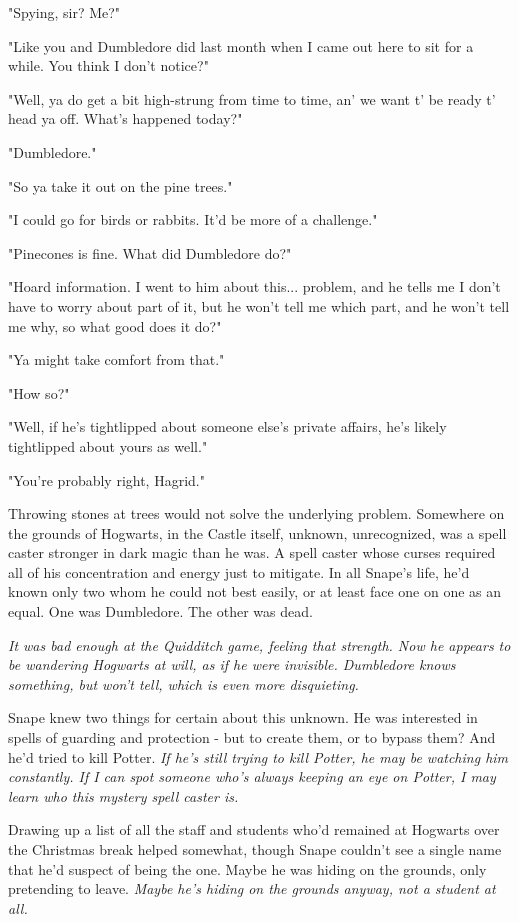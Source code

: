 \documentclass[a4paper,11pt]{article}
\begin{document}
"Spying, sir? Me?"

"Like you and Dumbledore did last month when I came out here to sit for a while. You think I don't notice?"

"Well, ya do get a bit high-strung from time to time, an' we want t' be ready t' head ya off. What's happened today?"

"Dumbledore."

"So ya take it out on the pine trees."

"I could go for birds or rabbits. It'd be more of a challenge."

"Pinecones is fine. What did Dumbledore do?"

"Hoard information. I went to him about this... problem, and he tells me I don't have to worry about part of it, but he won't tell me which part, and he won't tell me why, so what good does it do?"

"Ya might take comfort from that."

"How so?"

"Well, if he's tightlipped about someone else's private affairs, he's likely tightlipped about yours as well."

"You're probably right, Hagrid."

Throwing stones at trees would not solve the underlying problem. Somewhere on the grounds of Hogwarts, in the Castle itself, unknown, unrecognized, was a spell caster stronger in dark magic than he was. A spell caster whose curses required all of his concentration and energy just to mitigate. In all Snape's life, he'd known only two whom he could not best easily, or at least face one on one as an equal. One was Dumbledore. The other was dead.

\emph{It was bad enough at the Quidditch game, feeling that strength. Now he appears to be wandering Hogwarts at will, as if he were invisible. Dumbledore knows something, but won't tell, which is even more disquieting.}

Snape knew two things for certain about this unknown. He was interested in spells of guarding and protection - but to create them, or to bypass them? And he'd tried to kill Potter. \emph{If he's still trying to kill Potter, he may be watching him constantly. If I can spot someone who's always keeping an eye on Potter, I may learn who this mystery spell caster is.}

Drawing up a list of all the staff and students who'd remained at Hogwarts over the Christmas break helped somewhat, though Snape couldn't see a single name that he'd suspect of being the one. Maybe he was hiding on the grounds, only pretending to leave. \emph{Maybe he's hiding on the grounds anyway, not a student at all.}
\end{document}
